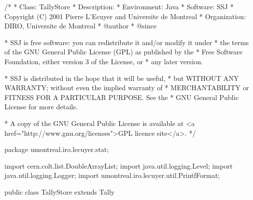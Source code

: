 \begin{code}
\begin{hide}
/*
 * Class:        TallyStore
 * Description:
 * Environment:  Java
 * Software:     SSJ
 * Copyright (C) 2001  Pierre L'Ecuyer and Universite de Montreal
 * Organization: DIRO, Universite de Montreal
 * @author
 * @since

 * SSJ is free software: you can redistribute it and/or modify it under
 * the terms of the GNU General Public License (GPL) as published by the
 * Free Software Foundation, either version 3 of the License, or
 * any later version.

 * SSJ is distributed in the hope that it will be useful,
 * but WITHOUT ANY WARRANTY; without even the implied warranty of
 * MERCHANTABILITY or FITNESS FOR A PARTICULAR PURPOSE.  See the
 * GNU General Public License for more details.

 * A copy of the GNU General Public License is available at
   <a href="http://www.gnu.org/licenses">GPL licence site</a>.
 */
\end{hide}
package umontreal.iro.lecuyer.stat;\begin{hide}
import cern.colt.list.DoubleArrayList;
import java.util.logging.Level;
import java.util.logging.Logger;
import umontreal.iro.lecuyer.util.PrintfFormat;
\end{hide}


public class TallyStore extends Tally \begin{hide} {

   private DoubleArrayList array = null;  // Where the observations are stored.
   private Logger log = Logger.getLogger ("umontreal.iro.lecuyer.stat");
\end{hide}
\end{code}

